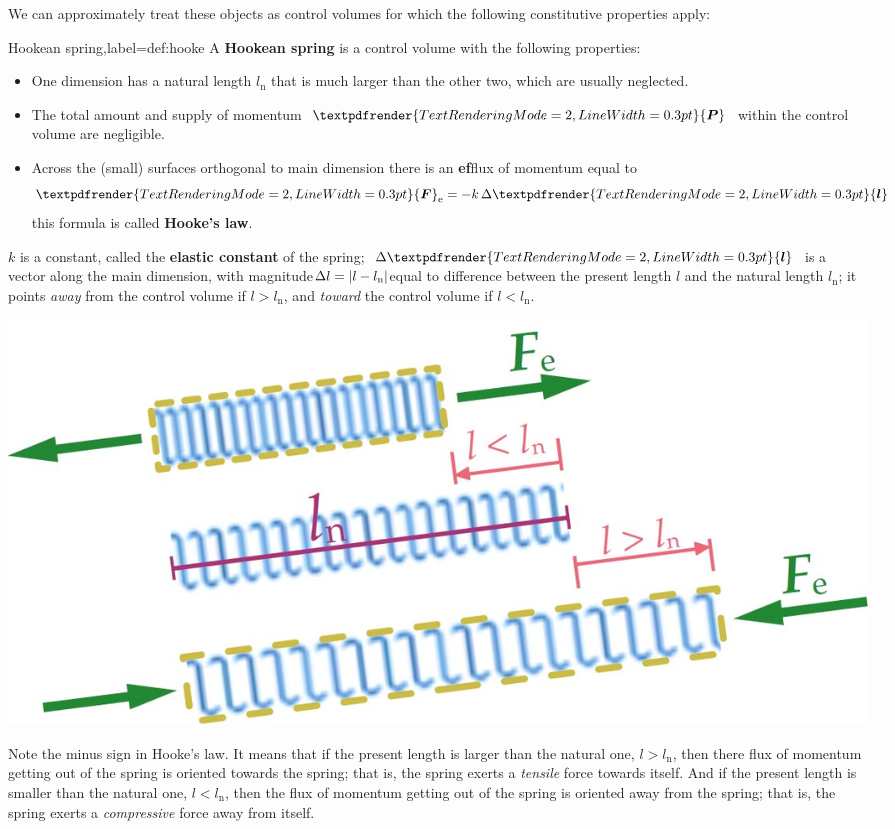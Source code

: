 \documentclass[a4paper,12pt,%
onecolumn,oneside,titlepage,%
british%
]{memoir}
\renewcommand*{\bm}[1]{\textpdfrender{TextRenderingMode=2,LineWidth=0.3pt}{\boldsymbol{#1}}}
\newcommand*{\incr}{\Delta}%
\DeclarePairedDelimiter\abs{\lvert}{\rvert}
\renewcommand*{\|}[1][]{\nonscript\:#1\vert\nonscript\:\mathopen{}}
\newcommand*{\ylo}{l_{\textrm{n}}}
\newcommand*{\yle}{l}
\newcommand*{\ydl}{\incr\bm{l}}
\newcommand*{\ydlm}{\incr l}
\newcommand*{\yP}{\bm{P}}
\newcommand*{\yF}{\bm{F}}
\begin{document}
We can approximately treat these objects as control volumes for which the following constitutive properties apply:
\begin{definition}{Hookean spring,label={def:hooke}}
  A \textbf{Hookean spring} is a control volume with the following properties:
  \begin{itemize}[shift]
  \item One dimension has a natural length $\ylo$ that is much larger than the other two, which are usually neglected.
  \item The total amount and supply of momentum $\yP$ within the control volume are negligible.
  \item Across the (small) surfaces orthogonal to main dimension there is an \textbf{ef}flux of momentum equal to
    \begin{equation}
      \label{eq:hooke}
      \yF_{\textrm{e}} = -k\,\ydl
    \end{equation}
    this formula is called \textbf{Hooke's law}.
  \end{itemize}
  $k$ is a constant, called the \textbf{elastic constant} of the spring; $\ydl$ is a vector along the main dimension, with magnitude\enspace$\ydlm = \abs{\yle-\ylo}$\enspace equal to difference between the present length $\yle$ and the natural length $\ylo$; it points \emph{away} from the control volume if $\yle>\ylo$, and \emph{toward} the control volume if $\yle<\ylo$.
  \begin{center}
\includegraphics[width=0.67\linewidth]{images/hooke3.jpg}%
  \end{center}
\end{definition}
%
Note the minus sign in Hooke's law. It means that if the present length is larger than the natural one, $\yle > \ylo$, then there flux of momentum getting out of the spring is oriented towards the spring; that is, the spring exerts a \emph{tensile} force towards itself. And if the present length is smaller than the natural one, $\yle < \ylo$, then the flux of momentum getting out of the spring is oriented away from the spring; that is, the spring exerts a \emph{compressive} force away from itself.
\end{document}
